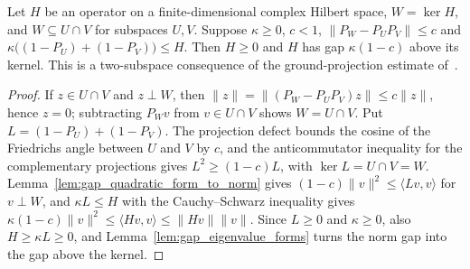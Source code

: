 \begin{theorem}
    \label{thm:martingale_two_ground_projections}
    \leanok
    Let $H$ be an operator on a finite-dimensional complex Hilbert space, $W=\ker H$,
    and $W\subseteq U\cap V$ for subspaces $U,V$. Suppose $\kappa\ge0$, $c<1$,
    $\lVert P_W-P_UP_V\rVert\le c$ and $\kappa\bigl((1-P_U)+(1-P_V)\bigr)\le H$. Then
    $H\ge0$ and $H$ has gap $\kappa(1-c)$ above its kernel. This is a two-subspace consequence of the
    ground-projection estimate of~\cite[Section~6, the three-interval commutation lemma,
        part~(ii)]{Nachtergaele1996Spectral}.
\end{theorem}
\begin{proof}\leanok
    If $z\in U\cap V$ and $z\perp W$, then $\lVert z\rVert=\lVert(P_W-P_UP_V)z\rVert\le
        c\lVert z\rVert$, hence $z=0$; subtracting $P_Wv$ from $v\in U\cap V$ shows
    $W=U\cap V$. Put $L=(1-P_U)+(1-P_V)$. The projection defect bounds the cosine of the
    Friedrichs angle between $U$ and $V$ by $c$, and the anticommutator inequality for
    the complementary projections gives $L^2\ge(1-c)L$, with $\ker L=U\cap V=W$.
    Lemma~\ref{lem:gap_quadratic_form_to_norm} gives
    $(1-c)\lVert v\rVert^2\le\langle Lv,v\rangle$ for $v\perp W$, and $\kappa L\le H$
    with the Cauchy--Schwarz inequality gives
    $\kappa(1-c)\lVert v\rVert^2\le\langle Hv,v\rangle\le\lVert Hv\rVert\lVert v\rVert$.
    Since $L\ge0$ and $\kappa\ge0$, also $H\ge\kappa L\ge0$, and
    Lemma~\ref{lem:gap_eigenvalue_forms} turns the norm gap into the gap above the kernel.
\end{proof}

